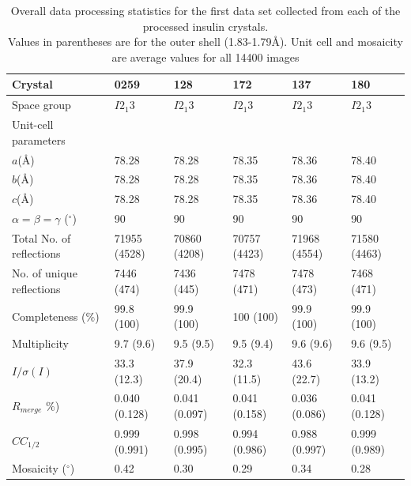 \begin{table}[ht!]
\centering
\captionsetup{justification=centering}
	\caption{Overall data processing statistics for the first data set collected from each of the processed insulin crystals.
	\\[1pt]
	Values in parentheses are for the outer shell (1.83-1.79\AA). Unit cell and mosaicity are average values for all 14400 images}
	\centering
	\begin{tabular}{p{3.5cm} p{2cm} p{2cm} p{2cm} p{2cm} p{2cm}}
		\hline
		Crystal  																	&0259				   &128						&172					 &137						&180						\\
		\hline
		Space group   														&$I2_{1}3$		 &$I2_{1}3$			&$I2_{1}3$	   &$I2_{1}3$			&$I2_{1}3$	 		\\
		Unit-cell parameters  										& 						 &    					&   					 &   						&  						 	\\
		$a$(\AA)  																&78.28				 &78.28					&78.35				 &78.36 				&78.40					\\
		$b$(\AA)  																&78.28				 &78.28					&78.35				 &78.36					&78.40					\\
		$c$(\AA)  																&78.28				 &78.28					&78.35				 &78.36				  &78.40					\\
		$\alpha = \beta = \gamma$ ($^{\circ}$) 		&90					   &90 						&90						 &90					 	&90							\\
		Total No. of reflections									&71955 (4528)  &70860 (4208)	&70757 (4423)	 &71968 (4554)	&71580 (4463)		\\
		No. of unique reflections									&7446 (474)	   &7436 (445)		&7478 (471)		 &7478 (473)		&7468 (471)			\\
		Completeness ($\%$) 											&99.8 (100)	   &99.9 (100)		&100 (100)		 &99.9 (100)		&99.9 (100) 		\\
		Multiplicity															&9.7 (9.6)		 &9.5 (9.5)			&9.5 (9.4)		 &9.6 (9.6)		  &9.6 (9.5)			\\
		$I/\sigma (I)$												 		&33.3 (12.3)	 &37.9 (20.4)		&32.3	 (11.5)	 &43.6 (22.7)	  &33.9 (13.2)  	\\
		$R_{merge}$ $\%$)													&0.040 (0.128) &0.041 (0.097) &0.041 (0.158) &0.036 (0.086) &0.041 (0.128)  \\
		$CC_{1/2}$																&0.999 (0.991) &0.998 (0.995) &0.994 (0.986) &0.988 (0.997) &0.999 (0.989)	\\
		Mosaicity ($^{\circ}$)										&0.42				   &0.30					&0.29					 &0.34					&0.28						\\
		\hline
	\end{tabular}
	\label{tab: Hamburg data processing}
\end{table}
